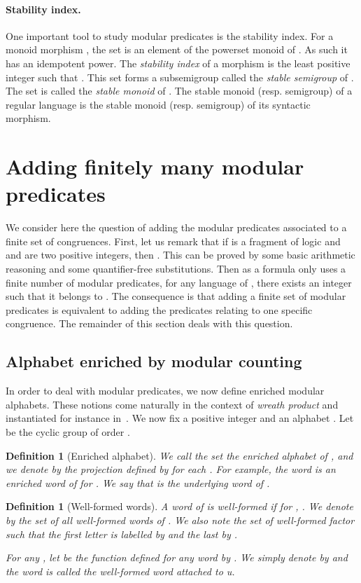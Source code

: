 \documentclass[submission,hidelink]{dmtcs-episciences}
\newtheorem{definition}[theorem]{Definition}
\begin{document}
\paragraph{Stability index.}
One important tool to study modular predicates is the stability index.
For a monoid morphism , the set  is an element of the powerset
monoid of .
As such it has an idempotent power. The \emph{stability index} of a morphism
is the 	least positive integer 
such that . This set forms a subsemigroup called
the \emph{stable semigroup} of
.
The set  is called the \emph{stable monoid}
of .
The stable monoid (resp. semigroup) of a regular language is the stable monoid (resp. semigroup) of its syntactic morphism.



\section{Adding finitely many modular predicates}\label{Section:Finite}

We consider here the question of adding the modular predicates associated to a finite set of congruences.
First, let us remark that if
 is a fragment of logic and  and  are two positive integers,
then . This can be proved by some basic arithmetic reasoning and some quantifier-free substitutions.
Then as a formula only uses a finite number of modular predicates, for any language of , there exists an integer  such that it belongs to .
The consequence is that adding a finite set of modular predicates is equivalent to adding the predicates relating to one specific congruence.
The remainder of this section deals with this question.



\subsection{Alphabet enriched by modular counting}

In order to deal with modular predicates, we now define enriched modular alphabets. These notions come naturally in the context of \emph{wreath product} and instantiated for instance in~\cite{DP13,DP15}.
We now fix a positive integer  and an alphabet . Let  be the cyclic group of order .
	\begin{definition}[Enriched alphabet]
		We call the set 
		the \emph{enriched alphabet} of ,
		and we denote by  the projection defined by 
		for each .
		For example,
		the word  is an enriched word of  for .
		We say that  is the \emph{underlying word} of .
	\end{definition}
	\begin{definition}[Well-formed words]
		A word  of  is \emph{well-formed} if
		for , . We denote by  the set of
		all well-formed words of .
We also note  the set of well-formed factor such that the first letter is labelled by  and the last by .

		For any , let  be the function defined
		for any word 
		by .
		We simply denote  by  and the word  is called the \emph{well-formed word attached} to u.
	\end{definition}
\end{document}
